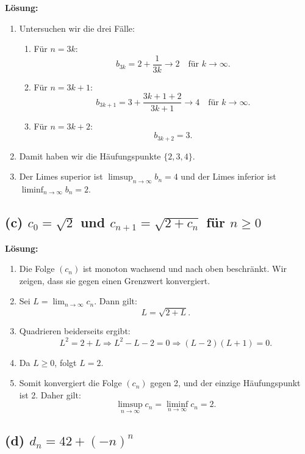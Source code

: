 \documentclass[11pt]{article}
\begin{document}
\textbf{Lösung:}
\begin{enumerate}
    \item Untersuchen wir die drei Fälle:
        \begin{enumerate}
            \item Für \( n = 3k \):
            \[
            b_{3k} = 2 + \frac{1}{3k} \to 2 \quad \text{für } k \to \infty.
            \]
            \item Für \( n = 3k + 1 \):
            \[
            b_{3k+1} = 3 + \frac{3k+1 + 2}{3k+1} \to 4 \quad \text{für } k \to \infty.
            \]
            \item Für \( n = 3k + 2 \):
            \[
            b_{3k+2} = 3.
            \]
        \end{enumerate}
    \item Damit haben wir die Häufungspunkte \( \{2, 3, 4\} \).
    \item Der Limes superior ist \( \limsup_{n \to \infty} b_n = 4 \) und der Limes inferior ist \( \liminf_{n \to \infty} b_n = 2 \).
\end{enumerate}

\subsection*{(c) \( c_0 = \sqrt{2} \) und \( c_{n+1} = \sqrt{2 + c_n} \) für \( n \geq 0 \)}

\textbf{Lösung:}
\begin{enumerate}
    \item Die Folge \( (c_n) \) ist monoton wachsend und nach oben beschränkt. Wir zeigen, dass sie gegen einen Grenzwert konvergiert.
    \item Sei \( L = \lim_{n \to \infty} c_n \). Dann gilt:
    \[
    L = \sqrt{2 + L}.
    \]
    \item Quadrieren beiderseits ergibt:
    \[
    L^2 = 2 + L \Rightarrow L^2 - L - 2 = 0 \Rightarrow (L - 2)(L + 1) = 0.
    \]
    \item Da \( L \geq 0 \), folgt \( L = 2 \).
    \item Somit konvergiert die Folge \( (c_n) \) gegen 2, und der einzige Häufungspunkt ist 2. Daher gilt:
    \[
    \limsup_{n \to \infty} c_n = \liminf_{n \to \infty} c_n = 2.
    \]
\end{enumerate}

\subsection*{(d) \( d_n = 42 + (-n)^n \)}
\end{document}
